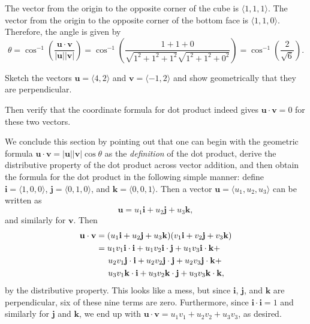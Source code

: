 \documentclass[svgnames]{report}
\begin{document}
\begin{solution} 
  The vector from the origin to the opposite corner of the cube is $\langle
  1,1,1\rangle$. The vector from the origin to the opposite corner of
  the bottom face is $\langle 1,1,0 \rangle$. Therefore, the angle is given by 
  \[
    \theta = \cos^{-1}\left(\frac{\mathbf{u} \cdot
        \mathbf{v}}{|\mathbf{u}||\mathbf{v}|}\right) = \cos^{-1}\left(
      \frac{1 + 1 + 0}{\sqrt{1^2 + 1^2 + 1^2}\sqrt{1^2+1^2+0^2}}
    \right) = \boxed{\cos^{-1}\left(\frac{2}{\sqrt{6}}\right)}. 
  \]
\end{solution}

\begin{exercise}{}{}
  Sketch the vectors $\mathbf{u} = \langle 4,2 \rangle$ and
  $\mathbf{v} = \langle -1, 2\rangle$ and show geometrically that they
  are perpendicular. 

  Then verify that the coordinate formula for dot product indeed gives 
  $\mathbf{u} \cdot \mathbf{v} = 0$ for these two vectors. 
\end{exercise}

We conclude this section by pointing out that one can begin with the
geometric formula
$\mathbf{u} \cdot \mathbf{v} = |\mathbf{u}| |\mathbf{v}| \cos\theta$
as the \textit{definition} of the dot product, derive the distributive
property of the dot product across vector addition, and then obtain
the formula for the dot product in the following simple manner: define
$\mathbf{i} = \langle1,0,0\rangle$,
$\mathbf{j} = \langle0,1,0\rangle$, and
$\mathbf{k} = \langle0,0,1\rangle$. Then a vector
$\mathbf{u} = \langle u_1, u_2, u_3\rangle$ can be written as
\[
\mathbf{u} = u_1 \mathbf{i} + u_2 \mathbf{j} + u_3 \mathbf{k},
\]
and similarly for $\mathbf{v}$. Then 
\begin{align*}
  \mathbf{u} \cdot \mathbf{v} &= (u_1 \mathbf{i} + u_2 \mathbf{j} + u_3
  \mathbf{k})(v_1 \mathbf{i} + v_2 \mathbf{j} + v_3 \mathbf{k})  \\
  &= u_1 v_1 \mathbf{i} \cdot \mathbf{i} + u_1 v_2 \mathbf{i} \cdot
    \mathbf{j}  + u_1 v_3 \mathbf{i} \cdot \mathbf{k}  + \\ 
  &\hspace{5mm}  u_2 v_1 \mathbf{j} \cdot \mathbf{i} + u_2 v_2 \mathbf{j} \cdot
    \mathbf{j}  + u_2 v_3 \mathbf{j} \cdot \mathbf{k}  + \\ 
  &\hspace{5mm}  u_3 v_1 \mathbf{k} \cdot \mathbf{i} + u_3 v_2 \mathbf{k} \cdot
    \mathbf{j}  + u_3 v_3 \mathbf{k} \cdot \mathbf{k},
\end{align*}
by the distributive property. This looks like a mess, but since
$\mathbf{i}$,  $\mathbf{j}$, and  $\mathbf{k}$ are 
perpendicular, six of these nine terms are zero. Furthermore, since
$\mathbf{i}\cdot \mathbf{i} = 1$ and similarly for $\mathbf{j}$ and
$\mathbf{k}$, we end up with $  \mathbf{u} \cdot \mathbf{v}  = u_1 v_1
+ u_2 v_2 + u_3 v_3$, as desired. 
\end{document}
